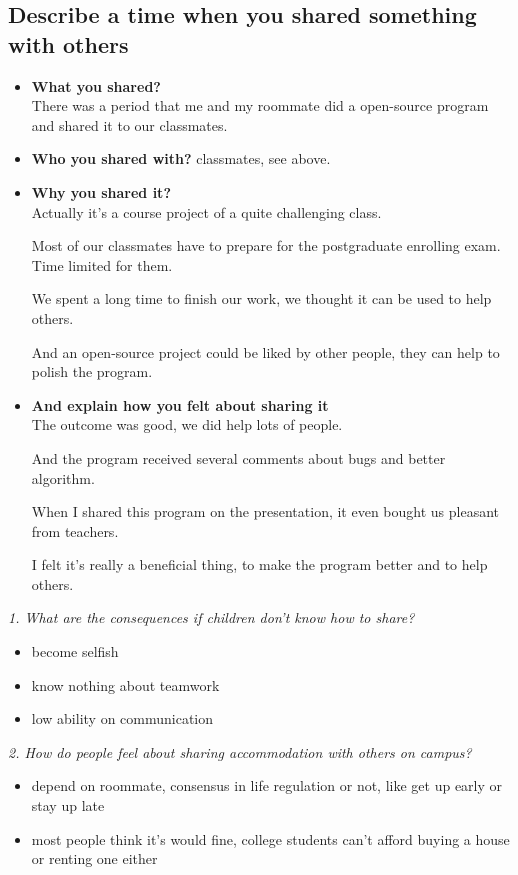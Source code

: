 \documentclass[conference]{IEEEtran}
\begin{document}
\subsection{Describe a time when you shared something with others}
\begin{itemize}
    \item \textbf{What you shared?}\\
    There was a period that me and my roommate did a open-source program and shared it to our classmates.
    \item \textbf{Who you shared with?}
    classmates, see above.
    \item \textbf{Why you shared it?}\\
    Actually it's a course project of a quite challenging class.

    Most of our classmates have to prepare for the postgraduate enrolling exam.
    Time limited for them.

    We spent a long time to finish our work, we thought it can be used to help others.

    And an open-source project could be liked by other people, they can help to polish the program.
    \item \textbf{And explain how you felt about sharing it}\\
    The outcome was good, we did help lots of people.

    And the program received several comments about bugs and better algorithm.

    When I shared this program on the presentation, it even bought us pleasant from teachers.

    I felt it's really a beneficial thing, to make the program better and to help others.
\end{itemize}

\textit{1. What are the consequences if children don't know how to share?}
\begin{itemize}
    \item become selfish
    \item know nothing about teamwork
    \item low ability on communication
\end{itemize}

\textit{2. How do people feel about sharing accommodation with others on campus?}
\begin{itemize}
    \item depend on roommate, consensus in life regulation or not, like get up early or stay up late
    \item most people think it's would fine, college students can't afford buying a house or renting one either
\end{itemize}
\end{document}
